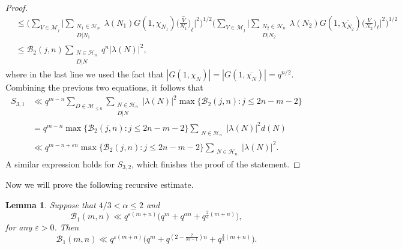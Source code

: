 \documentclass[12pt]{amsart}
\newtheorem{lemma}[theorem]{Lemma}
\begin{document}
\begin{proof}
\begin{align*}
& \leq \Big( \sum_{V \in \mathcal{M}_j} \Big|  \sum_{\substack{N_1\in \mathcal{H}_n\\D|N_1}}    \lambda(N_1)  G(1,\chi_{N_1}) \overline{ \Big( \frac{V}{N_1} \Big)}_{\ell} \Big|^2 \Big)^{1/2} \Big( \sum_{V \in \mathcal{M}_j} \Big|  \sum_{\substack{N_2\in \mathcal{H}_n\\D|N_2}}   \lambda(N_2)  G(1,\overline{\chi_{N_2}})  \Big( \frac{V}{N_2} \Big)_{\ell} \Big|^2 \Big)^{1/2}\\
& \leq \mathcal{B}_2(j,n) \sum_{\substack{N\in \mathcal{H}_n\\D|N}} q^n |\lambda(N)|^2,
\end{align*}
where in the last line we used the fact that $|G(1,\chi_N)|=|G(1,\overline{\chi_N})| = q^{n/2}.$
Combining the previous two equations, it follows that
\begin{align*}
S_{3,1} &\ll q^{m-n} \sum_{D\in \mathcal{M}_{\leq n}} \sum_{\substack{N\in \mathcal{H}_n\\D|N}} |\lambda(N)|^2 \max \{ \mathcal{B}_2(j,n) : j \leq 2n-m-2\} \\
& =q^{m-n}\max \{ \mathcal{B}_2(j,n) : j \leq 2n-m-2\}  \sum_{\substack{N\in \mathcal{H}_n}} |\lambda(N)|^2 d(N)  \\
& \ll q^{m-n+\varepsilon n} \max \{ \mathcal{B}_2(j,n) : j \leq 2n-m-2\}\sum_{\substack{N\in \mathcal{H}_n}} |\lambda(N)|^2.
\end{align*}
A similar expression holds for $S_{3,2}$, which finishes the proof of the statement.
\end{proof}
Now we will prove the following recursive estimate.
\begin{lemma}
\label{recursive}
Suppose that $4/3<\alpha \leq 2$ and
$$\mathcal{B}_1(m,n) \ll q^{\varepsilon(m+n)} \Big( q^m +q^{\alpha n} + q^{\frac{2}{3}(m+n)}\Big),$$ for any $\varepsilon>0$. Then
$$\mathcal{B}_1(m,n) \ll q^{\varepsilon(m+n)} \Big(q^m + q^{(2-\frac{2}{3\alpha-1})n} + q^{\frac{2}{3}(m+n)} \Big).$$
\end{lemma}
\end{document}
